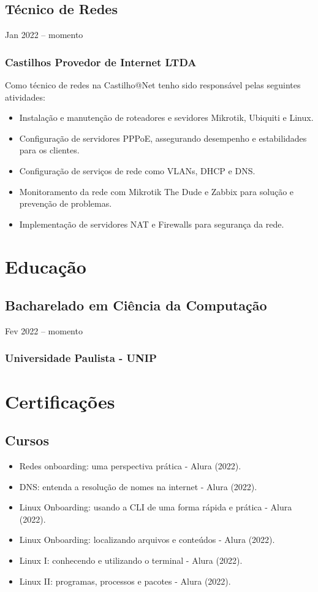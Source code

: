 \documentclass{cv}
\begin{document}
\subsection{Técnico de Redes}
{Jan 2022 -- momento}
\subsubsection{Castilhos Provedor de Internet LTDA}

Como técnico de redes na Castilho@Net tenho sido responsável pelas
seguintes atividades:

\begin{itemize}
  \item Instalação e manutenção de roteadores e sevidores Mikrotik,
    Ubiquiti e Linux.
  \item Configuração de servidores PPPoE, assegurando desempenho e
    estabilidades para os clientes.
  \item Configuração de serviços de rede como VLANs, DHCP e DNS.
  \item Monitoramento da rede com Mikrotik The Dude e Zabbix para
    solução e prevenção de problemas.
  \item Implementação de servidores NAT e Firewalls para segurança da rede.
\end{itemize}

\section{Educação}

\subsection{Bacharelado em Ciência da Computação}
{Fev 2022 -- momento}
\subsubsection{Universidade Paulista - UNIP}

\section{Certificações}

\subsection{Cursos}

\begin{itemize}
  \item Redes onboarding: uma perspectiva prática - Alura (2022).
  \item DNS: entenda a resolução de nomes na internet - Alura (2022).
  \item Linux Onboarding: usando a CLI de uma forma rápida e prática - Alura (2022).
  \item Linux Onboarding: localizando arquivos e conteúdos - Alura (2022).
  \item Linux I: conhecendo e utilizando o terminal - Alura (2022).
  \item  Linux II: programas, processos e pacotes - Alura (2022).
\end{itemize}
\end{document}
